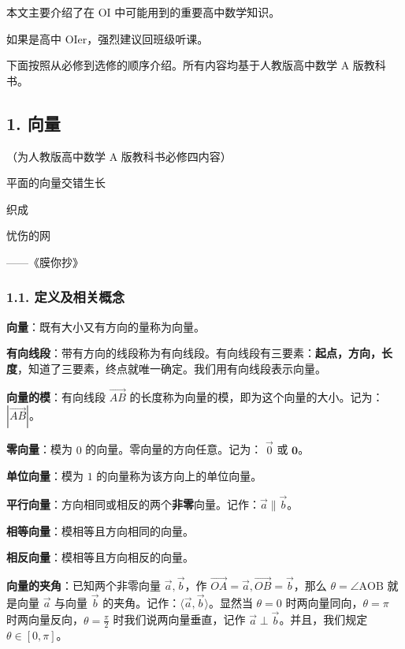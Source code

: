 
本文主要介绍了在 OI 中可能用到的重要高中数学知识。

如果是高中 OIer，强烈建议回班级听课。

下面按照从必修到选修的顺序介绍。所有内容均基于人教版高中数学 A 版教科书。

\subsection{1. 向量}

（为人教版高中数学 A 版教科书必修四内容）

\begin{QUOTE}{}{}
平面的向量交错生长



织成



忧伤的网



——《膜你抄》
\end{QUOTE}

\subsubsection{1.1. 定义及相关概念}

\textbf{向量}：既有大小又有方向的量称为向量。

\textbf{有向线段}：带有方向的线段称为有向线段。有向线段有三要素：\textbf{起点，方向，长度}，知道了三要素，终点就唯一确定。我们用有向线段表示向量。

\textbf{向量的模}：有向线段 $\vec{AB}$ 的长度称为向量的模，即为这个向量的大小。记为：$|\vec{AB}|$。

\textbf{零向量}：模为 $0$ 的向量。零向量的方向任意。记为： $\vec{0}$ 或 $\mathbf{0}$。

\textbf{单位向量}：模为 $1$ 的向量称为该方向上的单位向量。

\textbf{平行向量}：方向相同或相反的两个\textbf{非零}向量。记作：$\vec a\parallel \vec b$。

\textbf{相等向量}：模相等且方向相同的向量。

\textbf{相反向量}：模相等且方向相反的向量。

\textbf{向量的夹角}：已知两个非零向量 $\vec a,\vec b$，作 $\vec{OA}=\vec a,\vec{OB}=\vec b$，那么 $\theta=\angle \text{AOB}$ 就是向量 $\vec a$ 与向量 $\vec b$ 的夹角。记作：$\langle \vec a,\vec b\rangle$。显然当 $\theta =0$ 时两向量同向，$\theta=\pi$ 时两向量反向，$\theta=\frac{\pi}{2}$ 时我们说两向量垂直，记作 $\vec a\perp \vec b$。并且，我们规定 $\theta \in [0,\pi]$。

